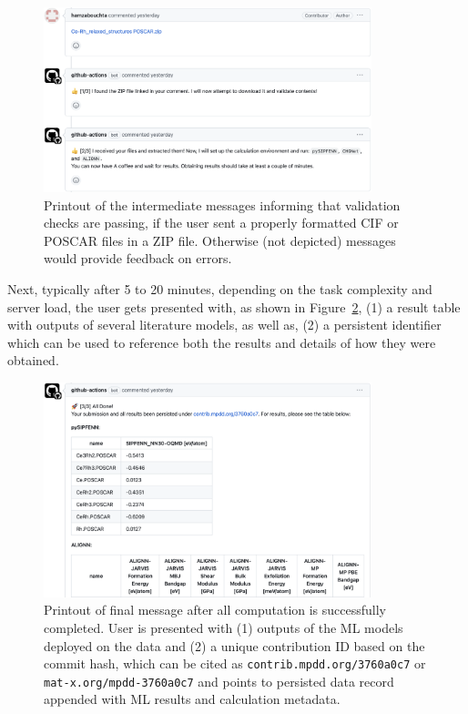 \begin{figure}[H]
    \centering
    \includegraphics[width=0.85\textwidth]{mpdd/mpddx2.png}
    \caption{Printout of the intermediate messages informing that validation checks are passing, if the user sent a properly formatted CIF or POSCAR files in a ZIP file. Otherwise (not depicted) messages would provide feedback on errors.}
    \label{mpdd:fig:mpddx2}
\end{figure}

Next, typically after 5 to 20 minutes, depending on the task complexity and server load, the user gets presented with, as shown in Figure~\ref{mpdd:fig:mpddx3}, (1) a result table with outputs of several literature models, as well as, (2) a persistent identifier which can be used to reference both the results and details of how they were obtained.

\begin{figure}[H]
    \centering
    \includegraphics[width=0.85\textwidth]{mpdd/mpddx3.png}
    \caption{Printout of final message after all computation is successfully completed. User is presented with (1) outputs of the ML models deployed on the data and (2) a unique contribution ID based on the commit hash, which can be cited as \texttt{contrib.mpdd.org/3760a0c7} or \texttt{mat-x.org/mpdd-3760a0c7} and points to persisted data record appended with ML results and calculation metadata.}
    \label{mpdd:fig:mpddx3}
\end{figure}

